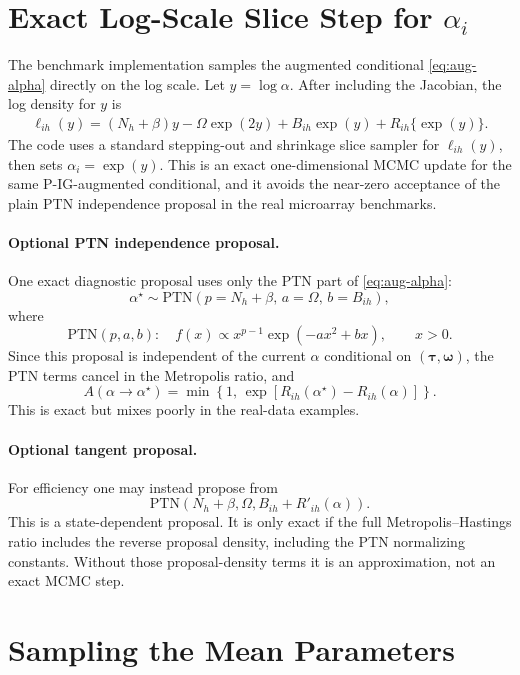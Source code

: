 \documentclass[11pt]{article}
\newcommand{\PTN}{\mathrm{PTN}}
\begin{document}
\section{Exact Log-Scale Slice Step for \texorpdfstring{\(\alpha_i\)}{alpha}}

The benchmark implementation samples the augmented conditional
\eqref{eq:aug-alpha} directly on the log scale.  Let \(y=\log\alpha\).  After
including the Jacobian, the log density for \(y\) is
\begin{align}
  \ell_{ih}(y)
  =
  (N_h+\beta)y
  -\Omega\exp(2y)
  +B_{ih}\exp(y)
  +R_{ih}\{\exp(y)\}.
  \label{eq:log-alpha-slice}
\end{align}
The code uses a standard stepping-out and shrinkage slice sampler for
\(\ell_{ih}(y)\), then sets \(\alpha_i=\exp(y)\).  This is an exact
one-dimensional MCMC update for the same P-IG-augmented conditional, and it
avoids the near-zero acceptance of the plain PTN independence proposal in the
real microarray benchmarks.

\paragraph{Optional PTN independence proposal.}
One exact diagnostic proposal uses only the PTN part of \eqref{eq:aug-alpha}:
\[
  \alpha^\star
  \sim
  \PTN\!\left(
    p=N_h+\beta,\,
    a=\Omega,\,
    b=B_{ih}
  \right),
\]
where
\[
  \PTN(p,a,b):\quad f(x)\propto x^{p-1}\exp(-a x^2+bx),\qquad x>0.
\]
Since this proposal is independent of the current \(\alpha\) conditional on
\((\bm\tau,\bm\omega)\), the PTN terms cancel in the Metropolis ratio, and
\[
  A(\alpha\to\alpha^\star)
  =
  \min\left\{
    1,\,
    \exp\!\left[
      R_{ih}(\alpha^\star)-R_{ih}(\alpha)
    \right]
  \right\}.
  \label{eq:exact-alpha-accept}
\]
This is exact but mixes poorly in the real-data examples.

\paragraph{Optional tangent proposal.}
For efficiency one may instead propose from
\[
  \PTN\!\left(N_h+\beta,\Omega,B_{ih}+R'_{ih}(\alpha)\right).
\]
This is a state-dependent proposal.  It is only exact if the full
Metropolis--Hastings ratio includes the reverse proposal density, including
the PTN normalizing constants.  Without those proposal-density terms it is an
approximation, not an exact MCMC step.

\section{Sampling the Mean Parameters}
\end{document}
